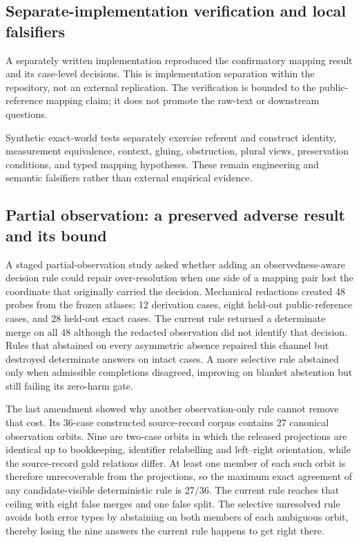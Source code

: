 \subsection{Separate-implementation verification and local falsifiers}

A separately written implementation reproduced the confirmatory mapping
result and its case-level decisions. This is implementation separation within
the repository, not an external replication. The verification is bounded to the
public-reference mapping claim; it does not promote the raw-text or downstream
questions.

Synthetic exact-world tests separately exercise referent and construct
identity, measurement equivalence, context, gluing, obstruction, plural views,
preservation conditions, and typed mapping hypotheses. These remain
engineering and semantic falsifiers rather than external empirical evidence.

\subsection{Partial observation: a preserved adverse result and its bound}

A staged partial-observation study asked whether adding an observedness-aware
decision rule could repair over-resolution when one side of a mapping pair
lost the coordinate that originally carried the decision. Mechanical
redactions created 48 probes from the frozen atlases: 12 derivation cases,
eight held-out public-reference cases, and 28 held-out exact cases. The current
rule returned a determinate merge on all 48 although the redacted observation
did not identify that decision. Rules that abstained on every asymmetric
absence repaired this channel but destroyed determinate answers on intact
cases. A more selective rule abstained only when admissible completions
disagreed, improving on blanket abstention but still failing its zero-harm
gate.

The last amendment showed why another observation-only rule cannot remove that
cost. Its 36-case constructed source-record corpus contains 27 canonical
observation orbits. Nine are two-case orbits in which the released projections
are identical up to bookkeeping, identifier relabelling and left--right
orientation, while the source-record gold relations differ. At least one
member of each such orbit is therefore unrecoverable from the projections, so
the maximum exact agreement of any candidate-visible deterministic rule is
27/36. The current rule reaches that ceiling with eight false merges and one
false split. The selective unresolved rule avoids both error types by
abstaining on both members of each ambiguous orbit, thereby losing the nine
answers the current rule happens to get right there.

